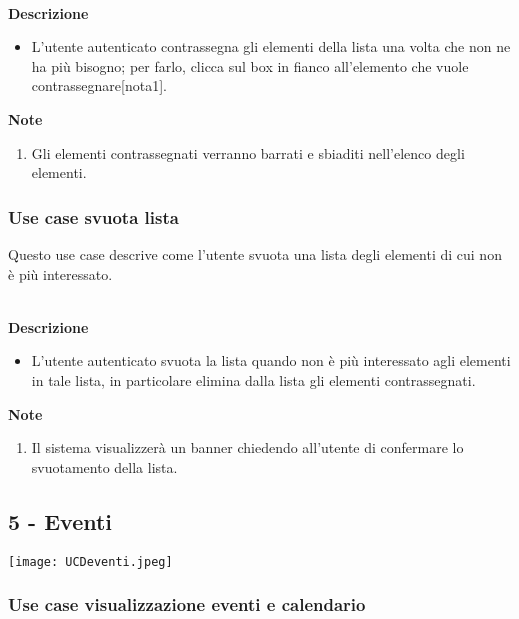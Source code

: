 \documentclass[a4paper,12pt]{article}
\begin{document}
\textbf{\\Descrizione}
\begin{itemize} \setlength\itemsep{0.01em}
\item L'utente autenticato contrassegna gli elementi della lista una volta che non ne ha più bisogno; per farlo, clicca sul box in fianco all'elemento che vuole contrassegnare[nota1].
\end{itemize}

\textbf{Note}
\begin{enumerate} \setlength\itemsep{0.01em}
\item Gli elementi contrassegnati verranno barrati e sbiaditi nell'elenco degli elementi.
\end{enumerate}



\subsubsection*{Use case svuota lista}

Questo use case descrive come l'utente svuota una lista degli elementi di cui non è più interessato.

\textbf{\\Descrizione}
\begin{itemize} \setlength\itemsep{0.01em}
\item L'utente autenticato svuota la lista quando non è più interessato agli elementi in tale lista, in particolare elimina dalla lista gli elementi contrassegnati.
\end{itemize}

\textbf{Note}
\begin{enumerate} \setlength\itemsep{0.01em}
\item Il sistema visualizzerà un banner chiedendo all'utente di confermare lo svuotamento della lista.
\end{enumerate}







\subsection*{5 - Eventi }

\begin{center}
  \texttt{[image: UCDeventi.jpeg]}
\end{center}
\subsubsection*{Use case visualizzazione eventi e calendario}
\end{document}
